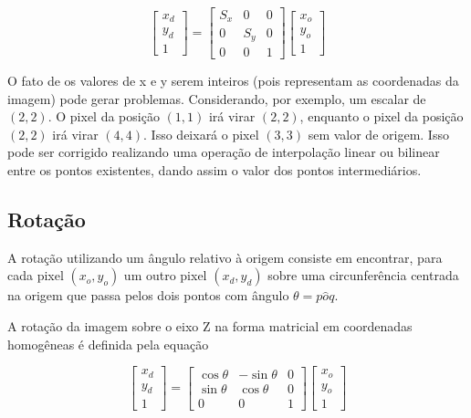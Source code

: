 \documentclass[12pt,oneside,a4paper,english,french,spanish,brazil,]{abntex2}
\begin{document}
\[
\begin{bmatrix}
x_d\\ 
y_d\\ 
1
\end{bmatrix}
=
\begin{bmatrix}
S_x & 0 & 0\\ 
0 & S_y & 0\\ 
0 & 0 & 1
\end{bmatrix}
\begin{bmatrix}
x_o\\ 
y_o\\ 
1
\end{bmatrix}
\]

O fato de os valores de x e y serem inteiros (pois representam as coordenadas da imagem) pode gerar problemas. Considerando, por exemplo, um escalar de \((2,2)\). O pixel da posição \((1,1)\) irá virar \((2,2)\), enquanto o pixel da posição \((2,2)\) irá virar \((4,4)\). Isso deixará o pixel \((3,3)\) sem valor de origem. Isso pode ser corrigido realizando uma operação de interpolação linear ou bilinear entre os pontos existentes, dando assim o valor dos pontos intermediários.

\subsection{Rotação}

A rotação utilizando um ângulo  relativo à origem consiste em encontrar, para cada pixel \((x_o,y_o)\) um outro pixel \((x_d,y_d)\) sobre uma circunferência centrada na origem que passa pelos dois pontos com ângulo \(\theta=p \hat{o} q\). 

A rotação da imagem sobre o eixo Z na forma matricial em coordenadas homogêneas é definida pela equação

\[
\begin{bmatrix}
x_d\\ 
y_d\\ 
1
\end{bmatrix}
=
\begin{bmatrix}
\cos{\theta} & -\sin{\theta} & 0\\ 
\sin{\theta} & \cos{\theta} & 0\\ 
0 & 0 & 1
\end{bmatrix}
\begin{bmatrix}
x_o\\ 
y_o\\ 
1
\end{bmatrix}
\]
\end{document}
